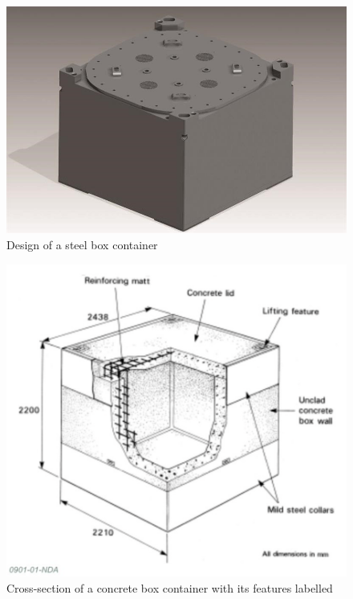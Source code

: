 \begin{figure}[H]
\centering
\includegraphics[scale=0.7]{Media/NuclearResearch/Pic_1_box2.jpg}
\caption{Design of a steel box container \cite{SteelBoxes}}
\label{Steel Boxes}
\end{figure}

\begin{figure}[H]
\centering
\includegraphics[scale=0.7]{Media/NuclearResearch/Screenshot 2021-03-15 at 02.54.08.png}
\caption{Cross-section of a concrete box container with its features labelled \cite{ConcreteBoxes}}
\label{Concrete Boxes}
\end{figure}

